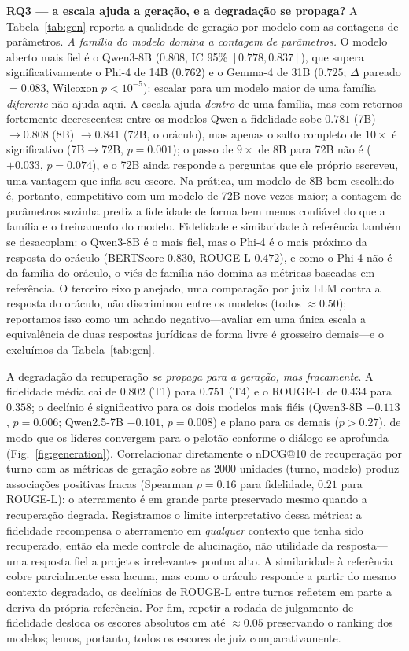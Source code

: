 \documentclass[conference]{IEEEtran}
\begin{document}
\textbf{RQ3 --- a escala ajuda a geração, e a degradação se propaga?}
A Tabela~\ref{tab:gen} reporta a qualidade de geração por modelo com as
contagens de parâmetros. \emph{A família do modelo domina a contagem de
parâmetros.} O modelo aberto mais fiel é o Qwen3-8B ($0.808$, IC 95\%
$[0.778, 0.837]$), que supera significativamente o Phi-4 de 14B ($0.762$) e o
Gemma-4 de 31B ($0.725$; $\Delta$ pareado $=0.083$, Wilcoxon $p<10^{-5}$):
escalar para um modelo maior de uma família \emph{diferente} não ajuda aqui. A
escala ajuda \emph{dentro} de uma família, mas com retornos fortemente
decrescentes: entre os modelos Qwen a fidelidade sobe $0.781$ (7B) $\to 0.808$
(8B) $\to 0.841$ (72B, o oráculo), mas apenas o salto completo de $10\times$ é
significativo (7B$\to$72B, $p{=}0.001$); o passo de $9\times$ de 8B para 72B
não é ($+0.033$, $p{=}0.074$), e o 72B ainda responde a perguntas que ele
próprio escreveu, uma vantagem que infla seu escore. Na prática, um modelo de
8B bem escolhido é, portanto, competitivo com um modelo de 72B nove vezes
maior; a contagem de parâmetros sozinha prediz a fidelidade de forma bem menos
confiável do que a família e o treinamento do modelo. Fidelidade e similaridade
à referência também se desacoplam: o Qwen3-8B é o mais fiel, mas o Phi-4 é o
mais próximo da resposta do oráculo (BERTScore $0.830$, ROUGE-L $0.472$), e
como o Phi-4 não é da família do oráculo, o viés de família não domina as
métricas baseadas em referência. O terceiro eixo planejado, uma comparação por
juiz LLM contra a resposta do oráculo, não discriminou entre os modelos (todos
$\approx0.50$); reportamos isso como um achado negativo---avaliar em uma única
escala a equivalência de duas respostas jurídicas de forma livre é grosseiro
demais---e o excluímos da Tabela~\ref{tab:gen}.

A degradação da recuperação \emph{se propaga para a geração, mas fracamente}.
A fidelidade média cai de $0.802$ (T1) para $0.751$ (T4) e o ROUGE-L de
$0.434$ para $0.358$; o declínio é significativo para os dois modelos mais
fiéis (Qwen3-8B $-0.113$, $p{=}0.006$; Qwen2.5-7B $-0.101$, $p{=}0.008$) e
plano para os demais ($p>0.27$), de modo que os líderes convergem para o
pelotão conforme o diálogo se aprofunda (Fig.~\ref{fig:generation}).
Correlacionar diretamente o nDCG@10 de recuperação por turno com as métricas de
geração sobre as 2000 unidades (turno, modelo) produz associações positivas
fracas (Spearman $\rho{=}0.16$ para fidelidade, $0.21$ para ROUGE-L): o
aterramento é em grande parte preservado mesmo quando a recuperação degrada.
Registramos o limite interpretativo dessa métrica: a fidelidade recompensa o
aterramento em \emph{qualquer} contexto que tenha sido recuperado, então ela
mede controle de alucinação, não utilidade da resposta---uma resposta fiel a
projetos irrelevantes pontua alto. A similaridade à referência cobre
parcialmente essa lacuna, mas como o oráculo responde a partir do mesmo
contexto degradado, os declínios de ROUGE-L entre turnos refletem em parte a
deriva da própria referência. Por fim, repetir a rodada de julgamento de
fidelidade desloca os escores absolutos em até $\approx0.05$ preservando o
ranking dos modelos; lemos, portanto, todos os escores de juiz
comparativamente.
\end{document}
